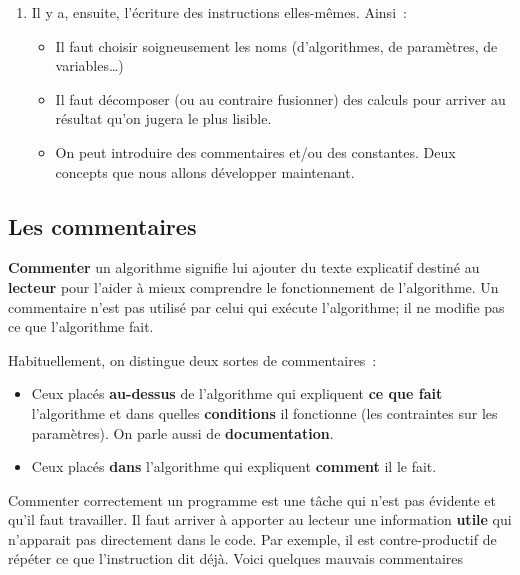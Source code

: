 \begin{enumerate}
		\item
			Il y a, ensuite, l’écriture des instructions elles-mêmes.
			Ainsi~:
			\begin{itemize}
			\item
				Il faut choisir soigneusement les noms 
				(d’algorithmes, de paramètres, de variables\dots)
			\item
				Il faut décomposer (ou au contraire fusionner)
				des calculs pour arriver au résultat qu’on jugera
				le plus lisible.
			\item 
				On peut introduire des commentaires et/ou
				des constantes. 
				Deux concepts que nous allons développer maintenant.
			\end{itemize}
			
		\end{enumerate}
				
		\subsection{Les commentaires}
	
			\textbf{Commenter} un algorithme
			signifie lui ajouter du texte explicatif
			destiné au \textbf{lecteur} pour l’aider à mieux
			comprendre le fonctionnement de l’algorithme.
			Un commentaire n’est pas utilisé par celui qui exécute
			l’algorithme; il ne modifie pas ce que l’algorithme fait.
			
			Habituellement, on distingue deux sortes de commentaires~:
			\begin{itemize}
			\item
				Ceux placés \textbf{au-dessus} de l’algorithme
				qui expliquent \textbf{ce que fait} l’algorithme
				et dans quelles \textbf{conditions} il fonctionne
				(les contraintes sur les paramètres).
				On parle aussi de \textbf{documentation}.
			\item
				Ceux placés \textbf{dans} l’algorithme
				qui expliquent \textbf{comment} il le fait.
			\end{itemize}
			
			Commenter correctement un programme
			est une tâche qui n’est pas évidente et qu’il faut travailler.
			Il faut arriver à apporter au lecteur
			une information \textbf{utile}
			qui n’apparait pas directement dans le code.
			Par exemple, il est contre-productif de répéter
			ce que l’instruction dit déjà.
			Voici quelques mauvais commentaires
			
